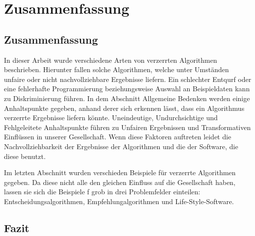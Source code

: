\chapter{Zusammenfassung}

\section{Zusammenfassung}

In dieser Arbeit wurde verschiedene Arten von verzerrten Algorithmen beschrieben. Hierunter fallen solche Algorithmen, welche unter Umständen unfaire oder nicht nachvollziehbare Ergebnisse liefern. Ein schlechter Entqurf oder eine fehlerhafte Programmierung beziehungsweise Auswahl an Beispieldaten kann zu Diskriminierung führen. In dem Abschnitt Allgemeine Bedenken werden einige Anhaltspunkte gegeben, anhand derer sich erkennen lässt, dass ein Algorithmus verzerrte Ergebnisse liefern könnte.  
    Uneindeutige, Undurchsichtige und Fehlgeleitete Anhaltspunkte führen zu Unfairen Ergebnissen und Transformativen Einflüssen in unserer Gesellschaft.
    Wenn diese Faktoren auftreten leidet die Nachvollziehbarkeit der Ergebnisse der Algorithmen und die der Software, die diese benutzt.

Im letzten Abschnitt wurden verschieden Beispiele für verzerrte Algorithmen gegeben. Da diese nicht alle den gleichen Einfluss auf die Gesellschaft haben, lassen sie sich die Beispiele f
grob in drei Problemfelder einteilen: Entscheidungsalgorithmen, Empfehlungalgorithmen und Life-Style-Software. 

\section{Fazit}



